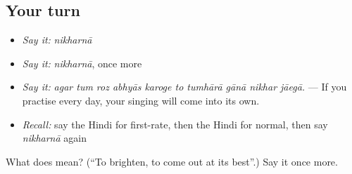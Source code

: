 \subsection*{Your turn}
\begin{itemize}
\raggedright
  \item \emph{Say it:} \emph{nikharnā}
  \item \emph{Say it:} \emph{nikharnā}, once more
  \item \emph{Say it:} \emph{agar tum roz abhyās karoge to tumhārā gānā nikhar jāegā.} — If you practise every day, your singing will come into its own.
  \item \emph{Recall:} say the Hindi for first-rate, then the Hindi for normal, then say \emph{nikharnā} again
\end{itemize}

\begin{tcolorbox}[breakable,colback=teal!4,colframe=teal!35!black,title={Before you move on}]
What does  mean? (\textquotedblleft{}To brighten, to come out at its best\textquotedblright{}.) Say it once more.
\end{tcolorbox}
